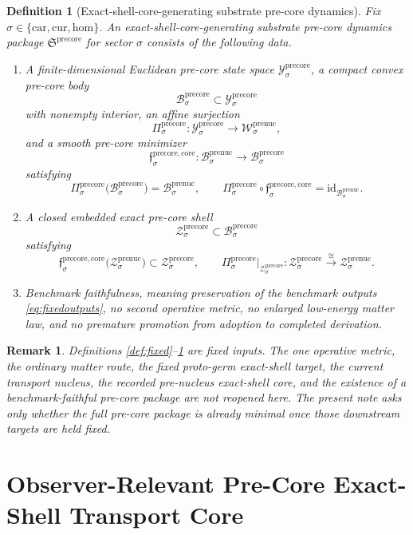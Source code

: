 \documentclass[11pt]{article}
\newcommand{\Car}{\mathrm{car}}
\newcommand{\Cur}{\mathrm{cur}}
\newcommand{\Hom}{\mathrm{hom}}
\newcommand{\PreNucSpace}[1]{\mathcal W_{#1}^{\mathrm{prenuc}}}
\newcommand{\PreNucBody}[1]{\mathcal B_{#1}^{\mathrm{prenuc}}}
\newcommand{\PreNucShellSet}[1]{\mathcal Z_{#1}^{\mathrm{prenuc}}}
\newcommand{\PreCorePackage}{\mathfrak S^{\mathrm{precore}}}
\newcommand{\PreCoreSpace}[1]{\mathcal Y_{#1}^{\mathrm{precore}}}
\newcommand{\PreCoreBody}[1]{\mathcal B_{#1}^{\mathrm{precore}}}
\newcommand{\PreCoreProj}[1]{\Pi_{#1}^{\mathrm{precore}}}
\newcommand{\PreCoreCoreMin}[1]{\mathfrak f_{#1}^{\mathrm{precore,core}}}
\newcommand{\PreCoreShellSet}[1]{\mathcal Z_{#1}^{\mathrm{precore}}}
\newtheorem{definition}{Definition}
\newtheorem{remark}{Remark}
\begin{document}
\begin{definition}[Exact-shell-core-generating substrate pre-core dynamics]
\label{def:precore}
Fix \(\sigma\in\{\Car,\Cur,\Hom\}\). An exact-shell-core-generating substrate pre-core dynamics package \(\PreCorePackage\) for sector \(\sigma\) consists of the following data.
\begin{enumerate}
    \item A finite-dimensional Euclidean pre-core state space \(\PreCoreSpace{\sigma}\), a compact convex pre-core body
    \[
    \PreCoreBody{\sigma}\subset\PreCoreSpace{\sigma}
    \]
    with nonempty interior, an affine surjection
    \[
    \PreCoreProj{\sigma}:\PreCoreSpace{\sigma}\to\PreNucSpace{\sigma},
    \]
    and a smooth pre-core minimizer
    \[
    \PreCoreCoreMin{\sigma}:\PreNucBody{\sigma}\to\PreCoreBody{\sigma}
    \]
    satisfying
    \[
    \PreCoreProj{\sigma}\bigl(\PreCoreBody{\sigma}\bigr)=\PreNucBody{\sigma},
    \qquad
    \PreCoreProj{\sigma}\circ\PreCoreCoreMin{\sigma}
    =
    \mathrm{id}_{\PreNucBody{\sigma}}.
    \]
    \item A closed embedded exact pre-core shell
    \[
    \PreCoreShellSet{\sigma}\subset\PreCoreBody{\sigma}
    \]
    satisfying
    \[
    \PreCoreCoreMin{\sigma}\bigl(\PreNucShellSet{\sigma}\bigr)
    \subset
    \PreCoreShellSet{\sigma},
    \qquad
    \PreCoreProj{\sigma}\big|_{\PreCoreShellSet{\sigma}}
    :
    \PreCoreShellSet{\sigma}
    \xrightarrow{\cong}
    \PreNucShellSet{\sigma}.
    \]
    \item Benchmark faithfulness, meaning preservation of the benchmark outputs \eqref{eq:fixedoutputs}, no second operative metric, no enlarged low-energy matter law, and no premature promotion from adoption to completed derivation.
\end{enumerate}
\end{definition}

\begin{remark}
Definitions \ref{def:fixed}--\ref{def:precore} are fixed inputs. The one operative metric, the ordinary matter route, the fixed proto-germ exact-shell target, the current transport nucleus, the recorded pre-nucleus exact-shell core, and the existence of a benchmark-faithful pre-core package are not reopened here. The present note asks only whether the full pre-core package is already minimal once those downstream targets are held fixed.
\end{remark}

\section{Observer-Relevant Pre-Core Exact-Shell Transport Core}
\end{document}
